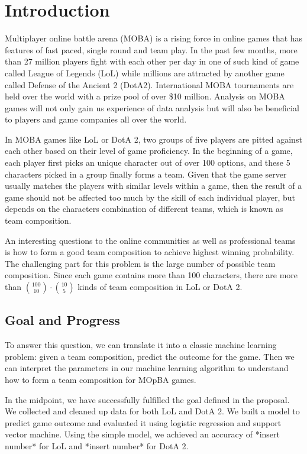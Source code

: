 \documentclass[conference]{IEEEtran}
\begin{document}
\section{Introduction}

Multiplayer online battle arena (MOBA) is a rising force in online games that has features of fast paced, single round and team play. In the past few months, more than 27 million players fight with each other per day in one of such kind of game called League of Legends (LoL)\cite{Ian} while millions are attracted by another game called Defense of the Ancient 2 (DotA2). International MOBA tournaments are held over the world with a prize pool of over \$10 million\cite{Valve}.  Analysis on MOBA games will not only gain us experience of data analysis but will also be beneficial to players and game companies all over the world.

In MOBA games like LoL or DotA 2, two groups of five players are pitted against each other based on their level of game proficiency. In the beginning of a game, each player first picks an unique character out of over 100 options, and these 5 characters picked in a group finally forms a team. Given that the game server usually matches the players with similar levels within a game, then the result of a game should not be affected too much by the skill of each individual player, but depends on the characters combination of different teams, which is known as team composition.

An interesting questions to the online communities as well as professional teams is how to form a good team composition to achieve highest winning probability. The challenging part for this problem is the large number of possible team composition. Since each game contains more than 100 characters, there are more than $\binom{100}{10}\cdot\binom{10}{5}$ kinds of team composition in LoL or DotA 2.


\subsection{Goal and Progress}

To answer this question, we can translate it into a classic machine learning problem: given a team composition, predict the outcome for the game. Then we can interpret the parameters in our machine learning algorithm to understand how to form a team composition for MOpBA games.

In the midpoint, we have successfully fulfilled the goal defined in the proposal.
We collected and cleaned up data for both LoL and DotA 2.
We built a model to predict game outcome and evaluated it using logistic regression and support vector machine.
Using the simple model, we achieved an accuracy of *insert number* for LoL and *insert number* for DotA 2.
\end{document}
